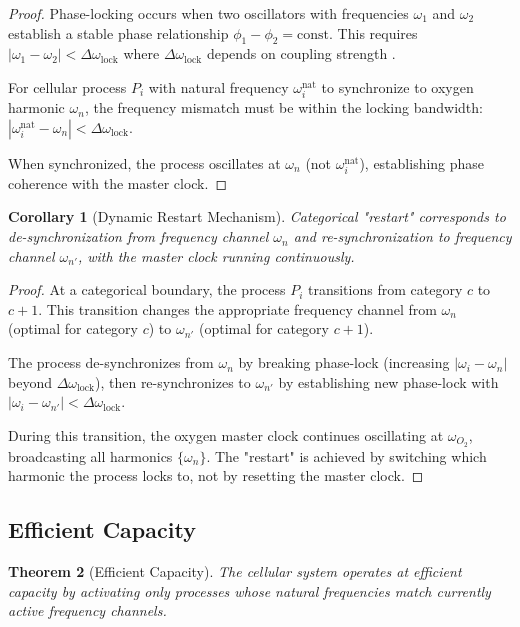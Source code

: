 \documentclass[11pt,twocolumn,a4paper]{article}
\newtheorem{theorem}{Theorem}[section]
\newtheorem{corollary}[theorem]{Corollary}
\theoremstyle{definition}
\theoremstyle{remark}
\newcommand{\omegalock}{\Delta\omega_{\mathrm{lock}}}
\begin{document}
\begin{proof}
Phase-locking occurs when two oscillators with frequencies $\omega_1$ and $\omega_2$ establish a stable phase relationship $\phi_1 - \phi_2 = \text{const}$. This requires $|\omega_1 - \omega_2| < \omegalock$ where $\omegalock$ depends on coupling strength \citep{pikovsky2001synchronization,strogatz2000kuramoto}.

For cellular process $P_i$ with natural frequency $\omega_i^{\mathrm{nat}}$ to synchronize to oxygen harmonic $\omega_n$, the frequency mismatch must be within the locking bandwidth: $|\omega_i^{\mathrm{nat}} - \omega_n| < \omegalock$.

When synchronized, the process oscillates at $\omega_n$ (not $\omega_i^{\mathrm{nat}}$), establishing phase coherence with the master clock.
\end{proof}

\begin{corollary}[Dynamic Restart Mechanism]
\label{cor:dynamic_restart}
Categorical "restart" corresponds to de-synchronization from frequency channel $\omega_n$ and re-synchronization to frequency channel $\omega_{n'}$, with the master clock running continuously.
\end{corollary}

\begin{proof}
At a categorical boundary, the process $P_i$ transitions from category $c$ to $c+1$. This transition changes the appropriate frequency channel from $\omega_n$ (optimal for category $c$) to $\omega_{n'}$ (optimal for category $c+1$).

The process de-synchronizes from $\omega_n$ by breaking phase-lock (increasing $|\omega_i - \omega_n|$ beyond $\omegalock$), then re-synchronizes to $\omega_{n'}$ by establishing new phase-lock with $|\omega_i - \omega_{n'}| < \omegalock$.

During this transition, the oxygen master clock continues oscillating at $\omega_{O_2}$, broadcasting all harmonics $\{\omega_n\}$. The "restart" is achieved by switching which harmonic the process locks to, not by resetting the master clock.
\end{proof}

\subsection{Efficient Capacity}

\begin{theorem}[Efficient Capacity]
\label{thm:efficient_capacity}
The cellular system operates at efficient capacity by activating only processes whose natural frequencies match currently active frequency channels.
\end{theorem}
\end{document}
